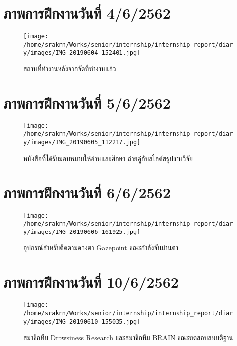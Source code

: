 \section*{ภาพการฝึกงานวันที่ 4/6/2562}
\begin{figure}[H]
    \centering
    \texttt{[image: /home/srakrn/Works/senior/internship/internship\_report/diary/images/IMG\_20190604\_152401.jpg]}
    \caption{สถานที่ทำงานหลังจากจัดที่ทำงานแล้ว}
\end{figure}

\section*{ภาพการฝึกงานวันที่ 5/6/2562}
\begin{figure}[H]
    \centering
    \texttt{[image: /home/srakrn/Works/senior/internship/internship\_report/diary/images/IMG\_20190605\_112217.jpg]}
    \caption{หนังสือที่ได้รับมอบหมายให้อ่านและศึกษา ถ่ายคู่กับสไลด์สรุปงานวิจัย}
\end{figure}

\section*{ภาพการฝึกงานวันที่ 6/6/2562}
\begin{figure}[H]
    \centering
    \texttt{[image: /home/srakrn/Works/senior/internship/internship\_report/diary/images/IMG\_20190606\_161925.jpg]}
    \caption{อุปกรณ์สำหรับติดตามดวงตา Gazepoint ขณะกำลังจับม่านตา}
\end{figure}

\section*{ภาพการฝึกงานวันที่ 10/6/2562}
\begin{figure}[H]
    \centering
    \texttt{[image: /home/srakrn/Works/senior/internship/internship\_report/diary/images/IMG\_20190610\_155035.jpg]}
    \caption{สมาชิกทีม Drowsiness Research และสมาชิกทีม BRAIN ขณะทดสอบสมมติฐาน}
\end{figure}

